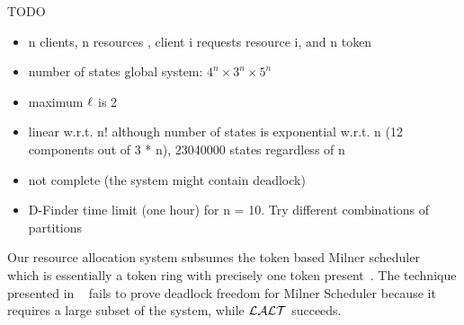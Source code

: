 TODO
\begin{itemize}
\item n clients, n resources , client i requests resource i, and n token 
\item number of states global system: $4^n \times 3^n \times 5^n$
\item maximum $\ell$ is 2
\item \LAO linear w.r.t. n! although number of states is exponential w.r.t. n (12 components out of 3 * n), 23040000 states regardless of n
\item \LLin not complete (the system might contain deadlock)
\item D-Finder time limit (one hour) for n = 10. Try different combinations of partitions
\end{itemize}


Our resource allocation system subsumes the token based Milner scheduler~\cite{milner} which 
is essentially a token ring with precisely one token present~\cite{AGR16}. 
The technique presented in ~\cite{AGR16} fails to prove deadlock freedom for Milner Scheduler 
because it requires a large subset of the system, 
while $\mathcal{LALT}$ succeeds. 
